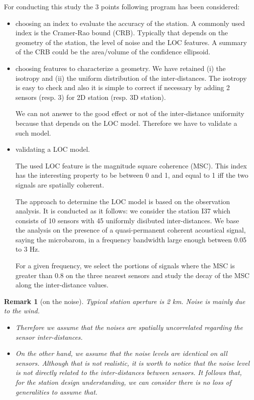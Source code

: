\documentclass[a4paper, 12pt]{report}
\newtheorem{remark}{Remark}
\begin{document}
For conducting this study the 3 points following program has been considered:
\begin{itemize}
 \item
choosing an index to evaluate the accuracy of the station. A commonly used index is the Cramer-Rao bound (CRB). Typically that depends on the geometry of the station, the level of noise and the LOC features. A summary of the CRB could be the area/volume of the confidence ellipsoid.

 \item
choosing features to characterize a geometry. We have retained (i) the isotropy and (ii) the uniform distribution of the inter-distances. The isotropy is easy to check and also it is simple to correct if necessary by adding 2 sensors (resp. 3) for 2D station (resp. 3D station).

We can not answer to the good effect or not of the inter-distance uniformity because that depends on the LOC model. Therefore we have to validate a such model.

\item
validating a LOC model.

The used LOC feature is the magnitude square coherence (MSC). This index has the interesting property to be between 0 and 1, and equal to 1 iff the two signals are spatially coherent.

	The approach to determine the LOC model is based on the observation analysis. It is conducted as it follows: we consider the station I37 which consists of 10 sensors with 45 uniformly disibuted inter-distances. We base the analysis on the presence of a quasi-permanent coherent acoustical signal, saying the microbarom, in a frequency bandwidth large enough between 0.05 to 3 Hz. 

For a given frequency, we select the portions of signals where the MSC is greater than 0.8 on the three nearest sensors and study the decay of the MSC along the inter-distance values.

\end{itemize}



\begin{remark}[on the noise]
Typical station aperture  is 2 km. Noise is mainly due to the wind.
\begin{itemize}
\item
Therefore we assume that the noises are spatially uncorrelated regarding the sensor inter-distances.
\item
On the other hand, we assume that the noise levels are identical on all sensors. Although that is not realistic, it is worth to notice that the noise level is not directly related to the inter-distances between sensors. It follows that, for the station design understanding, we can consider there is no loss of generalities to assume that.
\end{itemize}
\end{remark}
\end{document}
